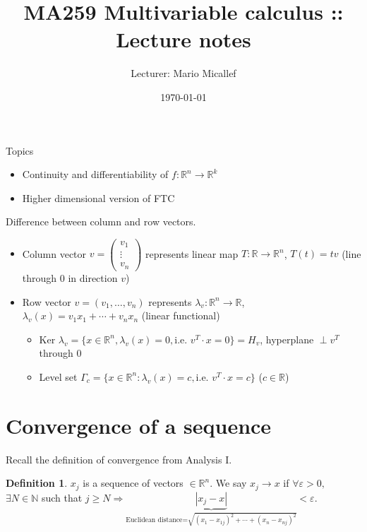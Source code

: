 \documentclass[a4paper]{article}
\title{MA259 Multivariable calculus :: Lecture notes}
\author{Lecturer: Mario Micallef}
\date{\today}
\theoremstyle{definition}
\newtheorem{defn}{Definition}[subsection]
\begin{document}
\maketitle
\thispagestyle{empty}

\tableofcontents
\thispagestyle{empty}
\newpage
\setcounter{page}{1}

Topics
\begin{itemize}
	\item Continuity and differentiability of $f: \mathbb{R}^n \rightarrow \mathbb{R}^k$
	\item Higher dimensional version of FTC
\end{itemize}

Difference between column and row vectors.

\begin{itemize}
	\item Column vector $v=\begin{pmatrix}
		v_1 \\ \vdots \\ v_n
	\end{pmatrix}$ represents linear map $T: \mathbb{R} \rightarrow \mathbb{R}^n$, $T(t) = tv$ (line through 0 in direction $v$)
	\item Row vector $v=(v_1,\ldots,v_n)$ represents $\lambda_v:\mathbb{R}^n \rightarrow \mathbb{R}$, $\lambda_v(x)=v_1x_1+\cdots+v_nx_n$ (linear functional)
	\begin{itemize}
		\item Ker $\lambda_v = \{ x \in \mathbb{R}^n, \lambda_v(x)=0, \text{i.e. }v^T \cdot x =0 \}=H_v$, hyperplane $\perp v^T$ through 0
		\item Level set $\Gamma_c=\{ x \in \mathbb{R}^n : \lambda_v(x)=c, \text{i.e. } v^T \cdot x=c \}$ ($c\in \mathbb{R}$)
	\end{itemize} 
\end{itemize}

\section{Convergence of a sequence}
Recall the definition of convergence from Analysis I.
\begin{defn}
	$x_j$ is a sequence of vectors $\in \mathbb{R}^n$. We say $x_j \rightarrow x$ if $\forall \varepsilon > 0,$ $\exists N \in \mathbb N$ such that $j \geq N \Rightarrow \underbrace{|x_j-x|}_{\text{Euclidean distance=}\sqrt{(x_1-x_{1j})^2+\cdots +(x_n-x_{nj})^2}} < \varepsilon$.
\end{defn}
\end{document}
